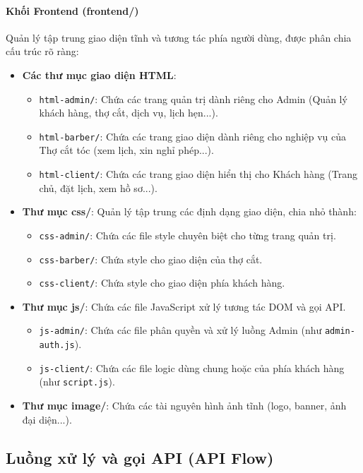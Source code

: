 \documentclass[../BTL.tex]{subfiles}
\begin{document}
\paragraph{Khối Frontend (frontend/)} Quản lý tập trung giao diện tĩnh và tương tác phía người dùng, được phân chia cấu trúc rõ ràng:

\begin{itemize}
    \item \textbf{Các thư mục giao diện HTML}:
    \begin{itemize}
        \item \texttt{html-admin/}: Chứa các trang quản trị dành riêng cho Admin (Quản lý khách hàng, thợ cắt, dịch vụ, lịch hẹn...).
        \item \texttt{html-barber/}: Chứa các trang giao diện dành riêng cho nghiệp vụ của Thợ cắt tóc (xem lịch, xin nghỉ phép...).
        \item \texttt{html-client/}: Chứa các trang giao diện hiển thị cho Khách hàng (Trang chủ, đặt lịch, xem hồ sơ...).
    \end{itemize}
    \item \textbf{Thư mục css/}: Quản lý tập trung các định dạng giao diện, chia nhỏ thành:
    \begin{itemize}
        \item \texttt{css-admin/}: Chứa các file style chuyên biệt cho từng trang quản trị.
        \item \texttt{css-barber/}: Chứa style cho giao diện của thợ cắt.
        \item \texttt{css-client/}: Chứa style cho giao diện phía khách hàng.
    \end{itemize}
    \item \textbf{Thư mục js/}: Chứa các file JavaScript xử lý tương tác DOM và gọi API.
    \begin{itemize}
        \item \texttt{js-admin/}: Chứa các file phân quyền và xử lý luồng Admin (như \texttt{admin-auth.js}).
        \item \texttt{js-client/}: Chứa các file logic dùng chung hoặc của phía khách hàng (như \texttt{script.js}).
    \end{itemize}
    \item \textbf{Thư mục image/}: Chứa các tài nguyên hình ảnh tĩnh (logo, banner, ảnh đại diện...).
\end{itemize}

\subsection{Luồng xử lý và gọi API (API Flow)}
\end{document}
